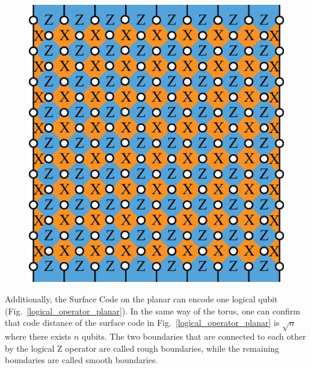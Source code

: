 \documentclass[a4paper,11pt]{ltjsarticle}
\begin{document}
{{        \begin{figure}[h]
            \centering
            \includegraphics[scale=0.30]{figure/planar.eps}
            \vspace{0pt}\caption{}
            \label{planar}
            \vspace{-10pt}
        \end{figure}

        Additionally, the Surface Code on the planar can encode one logical qubit (Fig.~\ref{logical_operator_planar}). In the same way of the torus, one can confirm that code distance of the surface code in Fig.~\ref{logical_operator_planar} is $\sqrt{n}$ where there exists $n$ qubits. The two boundaries that are connected to each other by the logical Z operator are called rough boundaries, while the remaining boundaries are called smooth boundaries.

}}
\end{document}
